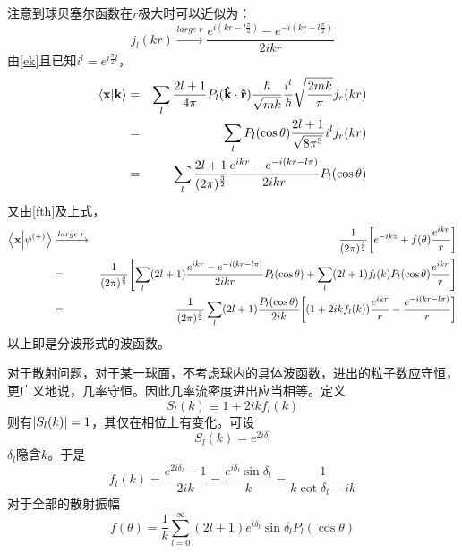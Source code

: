 \documentclass[hyperref]{ctexart}
\begin{document}
注意到球贝塞尔函数在$r$极大时可以近似为：
\begin{equation}\label{jlr}
  j_l(kr)\xrightarrow{large\; r}\frac{e^{i(kr-l\frac{\pi}{2})}-e^{-i(kr-l\frac{\pi}{2})}}{2ikr}
\end{equation}
由\eqref{ek}且已知$\displaystyle i^l=e^{i\frac{\pi}{2}l}$，
\begin{eqnarray}
  \braket{\vb{x}}{\vb{k}} &=& \sum_l\frac{2l+1}{4\pi}P_l(\vu{k}\cdot\vu{r})\frac{\hbar}{\sqrt{mk}}\frac{i^l}{\hbar}\sqrt{\frac{2mk}{\pi}}j_r(kr) \\
   &=& \sum_lP_l(\cos\theta)\frac{2l+1}{\sqrt{8\pi^3}}i^lj_r(kr) \\
   &=& \sum_l\frac{2l+1}{(2\pi)^\frac{3}{2}}\frac{e^{ikr}-e^{-i(kr-l\pi)}}{2ikr}P_l(\cos\theta)
\end{eqnarray}
又由\eqref{fth}及上式，
\begin{eqnarray}
  \nonumber\braket{\vb{x}}{\psi^{(+)}}&\xrightarrow{large\; r}&\frac{1}{(2\pi)^{\frac{3}{2}}}\bqty{e^{-ikz}+f(\theta)\frac{e^{ikr}}{r}} \\
  \nonumber &=& \frac{1}{(2\pi)^{\frac{3}{2}}}\bqty{\sum_l(2l+1)\frac{e^{ikr}-e^{-i(kr-l\pi)}}{2ikr}P_l(\cos\theta)+\sum_{l}(2l+1)f_l(k)P_l(\cos\theta)\frac{e^{ikr}}{r}} \\
   \label{xpsi}&=& \frac{1}{(2\pi)^{\frac{3}{2}}}\sum_l(2l+1)\frac{P_l(\cos\theta)}{2ik}\bqty{(1+2ikf_l(k))\frac{e^{ikr}}{r}-\frac{e^{-i(kr-l\pi)}}{r}}
\end{eqnarray}
以上即是分波形式的波函数。

对于散射问题，对于某一球面，不考虑球内的具体波函数，进出的粒子数应守恒，更广义地说，几率守恒。因此几率流密度进出应当相等。定义
\begin{equation}\label{si}
  S_l(k)\equiv1+2ikf_l(k)
\end{equation}
则有$\abs{S_l(k)}=1$，其仅在相位上有变化。可设
\begin{equation}\label{sl}
  S_l(k)=e^{2i\delta_l}
\end{equation}
$\delta_l$隐含$k$。于是
\begin{equation}\label{fldel}
  f_l(k)=\frac{e^{2i\delta_l}-1}{2ik}=\frac{e^{i\delta_l}\sin\delta_l}{k}=\frac{1}{k\cot\delta_l-ik}
\end{equation}
对于全部的散射振幅
\begin{equation}\label{fdel}
  f(\theta)=\frac{1}{k}\sum_{l=0}^{\infty}(2l+1)e^{i\delta_l}\sin\delta_lP_l(\cos\theta)
\end{equation}
\end{document}
